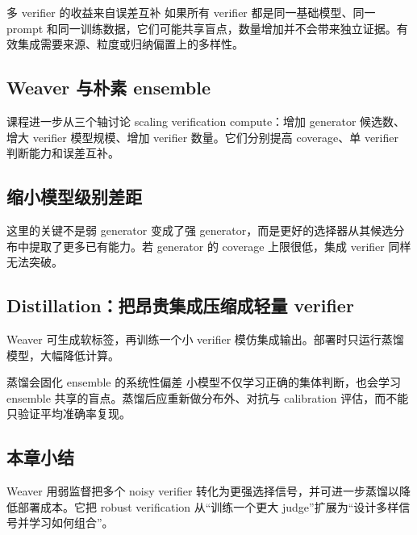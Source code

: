 
\begin{importantbox}{多 verifier 的收益来自误差互补}
如果所有 verifier 都是同一基础模型、同一 prompt 和同一训练数据，它们可能共享盲点，数量增加并不会带来独立证据。有效集成需要来源、粒度或归纳偏置上的多样性。
\end{importantbox}

\subsection{Weaver 与朴素 ensemble}


课程进一步从三个轴讨论 scaling verification compute：增加 generator 候选数、增大 verifier 模型规模、增加 verifier 数量。它们分别提高 coverage、单 verifier 判断能力和误差互补。


\subsection{缩小模型级别差距}


这里的关键不是弱 generator 变成了强 generator，而是更好的选择器从其候选分布中提取了更多已有能力。若 generator 的 coverage 上限很低，集成 verifier 同样无法突破。

\subsection{Distillation：把昂贵集成压缩成轻量 verifier}

Weaver 可生成软标签，再训练一个小 verifier 模仿集成输出。部署时只运行蒸馏模型，大幅降低计算。



\begin{warningbox}{蒸馏会固化 ensemble 的系统性偏差}
小模型不仅学习正确的集体判断，也会学习 ensemble 共享的盲点。蒸馏后应重新做分布外、对抗与 calibration 评估，而不能只验证平均准确率复现。
\end{warningbox}

\subsection{本章小结}

Weaver 用弱监督把多个 noisy verifier 转化为更强选择信号，并可进一步蒸馏以降低部署成本。它把 robust verification 从“训练一个更大 judge”扩展为“设计多样信号并学习如何组合”。

